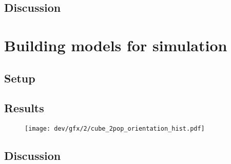 \subsection{Discussion}
% 
\begin{figure}[!t]
\centering
\def\tikzwidth{\textwidth}
\caption{}
\end{figure}
% 
\section{Building models for simulation}
% 
\subsection{Setup}
% 
\subsection{Results}
% 
\begin{figure}[!t]
\centering
\texttt{[image: dev/gfx/2/cube\_2pop\_orientation\_hist.pdf]}
\caption{}
\end{figure}
% 
\subsection{Discussion}

